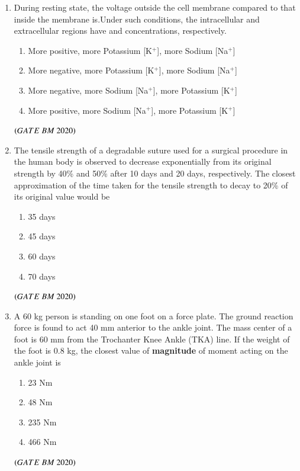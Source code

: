 \documentclass[journal,12pt,onecolumn]{IEEEtran}
\theoremstyle{remark}
\begin{document}
\begin{enumerate}
\item During resting state, the voltage outside the cell membrane compared to that inside the membrane is\underline{\hspace{2cm}}.Under such conditions, the intracellular and extracellular regions have
\underline{\hspace{2cm}} and \underline{\hspace{2cm}} concentrations, respectively.
\begin{enumerate}[label=\alph*)] 
\item\hspace{0.5cm}More positive, more Potassium [K$^+$], more Sodium [Na$^+$]
\item\hspace{0.5cm}More negative, more Potassium [K$^+$], more Sodium [Na$^+$]
\item\hspace{0.5cm}More negative, more Sodium [Na$^+$], more Potassium [K$^+$]
\item\hspace{0.5cm}More positive, more Sodium [Na$^+$], more Potassium [K$^+$]
\end{enumerate}
 \hfill $\left(GATE\ BM\ 2020\right)$
 
\item The tensile strength of a degradable suture used for a surgical procedure in the
human body is observed to decrease exponentially from its original strength by
40\% and 50\% after 10 days and 20 days, respectively. The closest approximation
of the time taken for the tensile strength to decay to 20\% of its original value
would be
\begin{enumerate}[label=\alph*)] 
\item\hspace{0.5cm}35 days
\item\hspace{0.5cm}45 days
\item\hspace{0.5cm}60 days
\item\hspace{0.5cm}70 days
\end{enumerate}
 \hfill $\left(GATE\ BM\ 2020\right)$
 
\item A 60 kg person is standing on one foot on a force plate. The ground reaction
force is found to act 40 mm anterior to the ankle joint. The mass center of a foot
is 60 mm from the Trochanter Knee Ankle (TKA) line. If the weight of the foot
is 0.8 kg, the closest value of \textbf{magnitude} of moment acting on the ankle joint is
\begin{enumerate}[label=\alph*)] 
\item\hspace{0.5cm}23 Nm
\item\hspace{0.5cm}48 Nm
\item\hspace{0.5cm}235 Nm
\item\hspace{0.5cm}466 Nm
\end{enumerate}
 \hfill $\left(GATE\ BM\ 2020\right)$
 

\end{enumerate}
\end{document}
